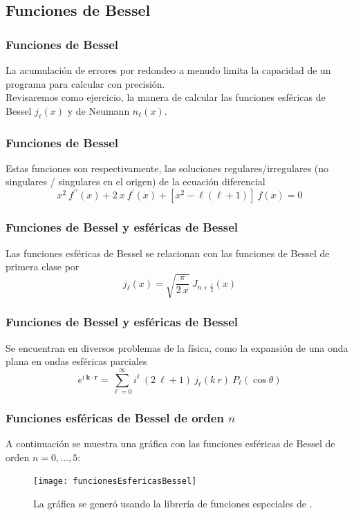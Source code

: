 \subsection{Funciones de Bessel}
\begin{frame}
\frametitle{Funciones de Bessel}
La acumulación de errores por redondeo a menudo limita la capacidad de un programa para calcular con precisión.
\\
\bigskip
\pause
Revisaremos como ejercicio, la manera de calcular las funciones esféricas de Bessel $j_{\ell}(x)$ y de Neumann $n_{\ell}(x)$.
\end{frame}
\begin{frame}
\frametitle{Funciones de Bessel}
Estas funciones son respectivamente, las soluciones regulares/irregulares (no singulares / singulares en el origen) de la ecuación diferencial
\begin{equation}
x^{2} \: f^{\prime \prime} (x) + 2 \: x \: f^{\prime}(x) + [ x^{2} - \ell ( \ell + 1)] \: f(x) = 0
\label{eq:ecuacion_02_19}
\end{equation}
\end{frame}
\begin{frame}
\frametitle{Funciones de Bessel y esféricas de Bessel}
Las funciones esféricas de Bessel se relacionan con las funciones de Bessel de primera clase por
\[ j_{\ell}(x) = \sqrt{\dfrac{\pi}{2 \: x}} \: J_{n + \frac{1}{2}} (x) \]
\end{frame}
\begin{frame}
\frametitle{Funciones de Bessel y esféricas de Bessel}
Se encuentran en diversos problemas de la física, como la expansión de una onda plana en ondas esféricas parciales
\begin{equation}
e^{i \: \mathbf{k \cdot r}} = \sum_{\ell = 0}^{\infty} i^{\ell} \: (2 \: \ell + 1) \: j_{\ell} (k \:  r) \: P_{\ell}(\cos \theta)
\label{eq:ecuacion_02_20}
\end{equation}    
\end{frame}
\begin{frame}
\frametitle{Funciones esféricas de Bessel de orden $n$}
\fontsize{12}{12}\selectfont
A continuación se muestra una gráfica con las funciones esféricas de Bessel de orden $n = 0, \ldots, 5$:
\begin{figure}
\centering
\texttt{[image: funcionesEsfericasBessel]}
\caption{La gráfica se generó usando la librería de funciones especiales de \python.}
\end{figure}
\end{frame}
